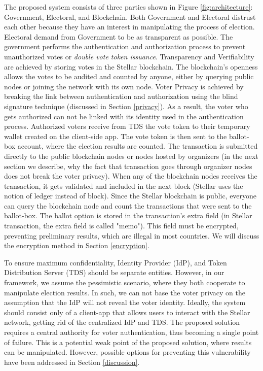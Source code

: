 \documentclass[applsci,article,submit,moreauthors,pdftex]{Definitions/mdpi}
\begin{document}
The proposed system consists of three parties shown in Figure \ref{fig:architecture}: Government, Electoral, and Blockchain. Both Government and Electoral distrust each other because they have an interest in manipulating the process of election. 
Electoral demand from Government to be as transparent as possible. The government performs the authentication and authorization process to prevent unauthorized votes or \textit{double vote token issuance}. Transparency and Verifiability are achieved by storing votes in the Stellar blockchain. The blockchain's openness allows the votes to be audited and counted by anyone, either by querying public nodes or joining the network with its own node. Voter Privacy is achieved by breaking the link between authentication and authorization using the blind signature technique (discussed in Section \ref{privacy}). As a result, the voter who gets authorized can not be linked with its identity used in the authentication process.
Authorized voters receive from TDS the vote token to their temporary wallet created on the client-side app. The vote token is then sent to the ballot-box account, where the election results are counted. The transaction is submitted directly to the public blockchain nodes or nodes hosted by organizers (in the next section we describe, why the fact that transaction goes through organizer nodes does not break the voter privacy). When any of the blockchain nodes receives the transaction, it gets validated and included in the next block (Stellar uses the notion of ledger instead of block). Since the Stellar blockchain is public, everyone can query the blockchain node and count the transactions that were sent to the ballot-box. The ballot option is stored in the transaction's extra field (in Stellar transaction, the extra field is called "memo"). This field must be encrypted, preventing preliminary results, which are illegal in most countries. We will discuss the encryption method in Section \ref{encryption}.


To ensure maximum confidentiality, Identity Provider (IdP), and Token Distribution Server (TDS) should be separate entities. However, in our framework, we assume the pessimistic scenario, where they both cooperate to manipulate election results. In such, we can not base the voter privacy on the assumption that the IdP will not reveal the voter identity.
Ideally, the system should consist only of a client-app that allows users to interact with the Stellar network, getting rid of the centralized IdP and TDS. 
The proposed solution requires a central authority for voter authentication, thus becoming a single point of failure. 
This is a potential weak point of the proposed solution, where results can be manipulated. However, possible options for preventing this vulnerability have been addressed in Section \ref{discussion}.
\end{document}

